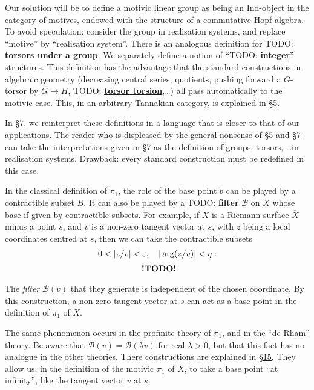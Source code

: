 \documentclass{article}
\theoremstyle{definition}
\newcommand{\unsure}[1]{TODO: \underline{\textbf{#1}}}
\newcommand{\todo}{\textbf{ !TODO! }}
\newcommand{\oldpage}[1]{\marginpar{\footnotesize$\Big\vert$ \textit{p.~#1}}}
\begin{document}
Our solution will be to define a motivic linear group as being an Ind-object in the category of motives, endowed with the structure of a commutative Hopf algebra.
To avoid speculation: consider the group in realisation systems, and replace ``motive'' by ``realisation system''.
There is an analogous definition for \unsure{torsors under a group}.
We separately define a notion of ``\unsure{integer}'' structures.
This definition has the advantage that the standard constructions in algebraic geometry (decreasing central series, quotients, pushing forward a $G$-torsor by $G\to H$, \unsure{torsor torsion},\ldots) all pass automatically to the motivic case.
This, in an arbitrary Tannakian category, is explained in \hyperref[5]{\S5}.

In \hyperref[7]{\S7}, we reinterpret these definitions in a language that is closer to that of our applications.
The reader who is displeased by the general nonsense of \hyperref[5]{\S5} and \hyperref[7]{\S7} can take the interpretations given in \hyperref[7]{\S7} as the definition of groups, torsors, \ldots in realisation systems.
Drawback: every standard construction must be redefined in this case.

In the classical definition of $\pi_1$, the role of the base point $b$ can be played by a contractible subset $B$.
It can also be played by a \unsure{filter} $\mathcal{B}$ on $X$ whose base if given by contractible subsets.
For example, if $X$ is a Riemann surface $\overline{X}$ minus a point $s$, and $v$ is a non-zero tangent vector at $s$, with $z$ being a local coordinates centred at $s$, then we can take the contractible subsets
\[
  \begin{gathered}
    0<|z/v|<\varepsilon,
    \quad
    |\arg(z/v)|<\eta:
  \\\begin{tikzpicture}
      \node at (0,0) {\todo};
    \end{tikzpicture}
  \end{gathered}
\]
The \emph{filter} $\mathcal{B}(v)$ that they generate is independent of the chosen coordinate.
By this construction, a non-zero tangent vector at $s$ can act as a base point in the definition of $\pi_1$ of $X$.

The same phenomenon occurs in the profinite theory of $\pi_1$, and in the ``de Rham'' theory.
Be aware that $\mathcal{B}(v)=\mathcal{B}(\lambda v)$ for real $\lambda>0$, but that this fact has no analogue in the other theories.
There constructions are explained in \hyperref[15]{\S15}.
They allow us,
\oldpage{86}
in the definition of the motivic $\pi_1$ of $X$, to take a base point ``at infinity'', like the tangent vector $v$ at $s$.
\end{document}
